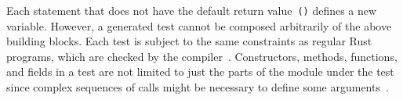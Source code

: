 \documentclass{article}
\begin{document}

Each statement that does not have the default return value~\lstinline{()} defines a new variable. However, a generated test cannot be composed arbitrarily of the above building blocks. Each test is subject to the same constraints as regular Rust programs, which are checked by the compiler~\cite{Tonella2004}. Constructors, methods, functions, and fields in a test are not limited to just the parts of the module under the test since complex sequences of calls might be necessary to define some arguments~\cite{Fraser2012}. 

\end{document}
